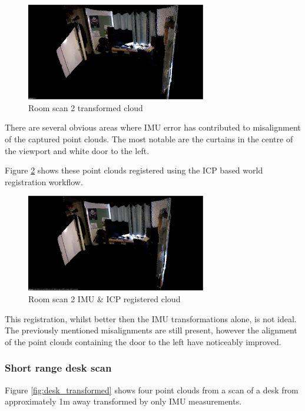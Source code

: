 \documentclass{entcs}
\begin{document}
\begin{figure}[h!]
  \centering
  \includegraphics[width=0.7\textwidth]{graphics/room_2_transformed.eps}
  \caption{Room scan 2 transformed cloud}
  \label{fig:room_2_transformed}
\end{figure}

There are several obvious areas where IMU error has contributed to misalignment
of the captured point clouds. The most notable are the curtains in the centre of
the viewport and white door to the left.

Figure \ref{fig:room_2_icp} shows these point clouds registered using the ICP
based world registration workflow.

\begin{figure}[h!]
  \centering
  \includegraphics[width=0.7\textwidth]{graphics/room_2_world_icp.eps}
  \caption{Room scan 2 IMU \& ICP registered cloud}
  \label{fig:room_2_icp}
\end{figure}

This registration, whilst better then the IMU transformations alone, is not
ideal. The previously mentioned misalignments are still present, however the
alignment of the point clouds containing the door to the left have noticeably
improved.

\subsubsection{Short range desk scan}

Figure \ref{fig:desk_transformed} shows four point clouds from a scan of a desk
from approximately 1m away transformed by only IMU measurements.
\end{document}
